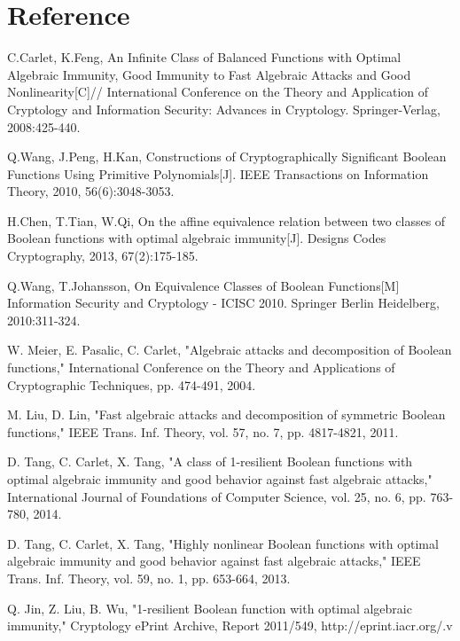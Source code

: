 \documentclass[mathserif,8pt]{beamer}
\begin{document}
\section{Reference}

\begin{thebibliography}{99}%
	
	
	 C.Carlet, K.Feng, An Infinite Class of Balanced Functions with Optimal Algebraic Immunity, Good Immunity to Fast Algebraic Attacks and Good Nonlinearity[C]// International Conference on the Theory and Application of Cryptology and Information Security: Advances in Cryptology. Springer-Verlag, 2008:425-440.
	
	Q.Wang, J.Peng, H.Kan, Constructions of Cryptographically Significant Boolean Functions Using Primitive Polynomials[J]. IEEE Transactions on Information Theory, 2010, 56(6):3048-3053.
	
		
	H.Chen, T.Tian, W.Qi, On the affine equivalence relation between two classes of Boolean functions with optimal algebraic immunity[J]. Designs Codes Cryptography, 2013, 67(2):175-185.
	
	Q.Wang, T.Johansson, On Equivalence Classes of Boolean Functions[M] Information Security and Cryptology - ICISC 2010. Springer Berlin Heidelberg, 2010:311-324.
	
		
	 W. Meier, E. Pasalic, C. Carlet, "Algebraic attacks and decomposition of Boolean functions," International Conference on the Theory and Applications of Cryptographic Techniques, pp. 474-491, 2004.
	
	 M. Liu, D. Lin, "Fast algebraic attacks and decomposition of symmetric Boolean functions," IEEE Trans. Inf. Theory, vol. 57, no. 7, pp. 4817-4821, 2011.
	
	 D. Tang, C. Carlet, X. Tang, "A class of 1-resilient Boolean functions with optimal algebraic immunity and good behavior against fast algebraic attacks," International Journal of Foundations of Computer Science, vol. 25, no. 6, pp. 763-780, 2014.
	
	 D. Tang, C. Carlet, X. Tang, "Highly nonlinear Boolean functions with optimal algebraic immunity and good behavior against fast algebraic attacks," IEEE Trans. Inf. Theory, vol. 59, no. 1, pp. 653-664, 2013.
		
	 Q. Jin, Z. Liu, B. Wu, "1-resilient Boolean function with optimal algebraic immunity," Cryptology ePrint Archive, Report 2011/549, http://eprint.iacr.org/.v


\end{thebibliography}
\end{document}
